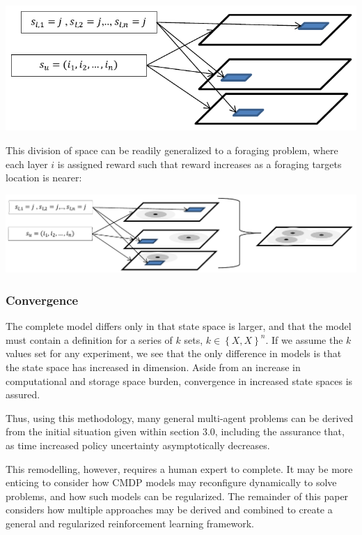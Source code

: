 \documentclass[compsoc,journal,letterpaper,10pt,draftcls,twocolumn]{IEEEtran}
\begin{document}
\includegraphics{media/figure9}
 
This division of space can be readily generalized to a foraging problem,
where each layer \(i\) is assigned reward such that reward increases as
a foraging targets location is nearer:

\includegraphics{media/figure10}

\subsubsection{}\label{section}

\subsubsection{Convergence}\label{convergence-2}

The complete model differs only in that state space is larger, and that
the model must contain a definition for a series of \(k\) sets,
\(k \in \left\{ X,X \right\}^{n}\). If we assume the \(k\) values set
for any experiment, we see that the only difference in models is that
the state space has increased in dimension. Aside from an increase in
computational and storage space burden, convergence in increased state
spaces is assured.

Thus, using this methodology, many general multi-agent problems can be
derived from the initial situation given within section 3.0, including
the assurance that, as time increased policy uncertainty asymptotically
decreases.

This remodelling, however, requires a human expert to complete. It may
be more enticing to consider how CMDP models may reconfigure dynamically
to solve problems, and how such models can be regularized. The remainder
of this paper considers how multiple approaches may be derived and
combined to create a general and regularized reinforcement learning
framework.
\end{document}
